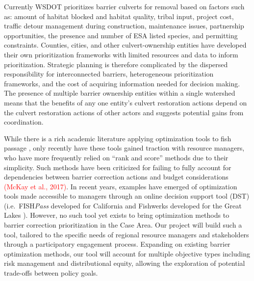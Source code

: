 \documentclass[12pt]{elsarticle}
\begin{document}
	Currently WSDOT prioritizes barrier culverts for removal based on factors such as: amount of habitat blocked and habitat quality, tribal input, project cost, traffic detour management during construction, maintenance issues, partnership opportunities, the presence and number of ESA listed species, and permitting constraints. Counties, cities, and other culvert-ownership entities have developed their own prioritization frameworks with limited resources and data to inform prioritization. Strategic planning is therefore complicated by the dispersed responsibility for interconnected barriers, heterogeneous prioritization frameworks, and the cost of acquiring information needed for decision making. The presence of multiple barrier ownership entities within a single watershed means that the benefits of any one entity's culvert restoration actions depend on the culvert restoration actions of other actors and suggests potential gains from coordination. 
	
	While there is a rich academic literature applying optimization tools to fish passage \citep{o2005optimizing, kuby2005multiobjective, mcmanamay2019commonalities, couto2021safeguarding}, only recently have these tools gained traction with resource managers, who have more frequently relied on ``rank and score'' methods due to their simplicity. Such methods have been criticized for failing to fully account for dependencies between barrier correction actions and budget considerations \textcolor{red}{(McKay et al., 2017)}. In recent years, examples have emerged of optimization tools made accessible to managers through an online decision support tool (DST) (i.e.\ FISH\emph{Pass} developed for California \citep{optipass2015migratory} and Fishwerks developed for the Great Lakes \citep{moody2017pet}). However, no such tool yet exists to bring optimization methods to barrier correction prioritization in the Case Area. Our project will build such a tool, tailored to the specific needs of regional resource managers and stakeholders through a participatory engagement process. Expanding on existing barrier optimization methods, our tool will account for multiple objective types including risk management and distributional equity, allowing the exploration of potential trade-offs between policy goals. 
	
\end{document}
